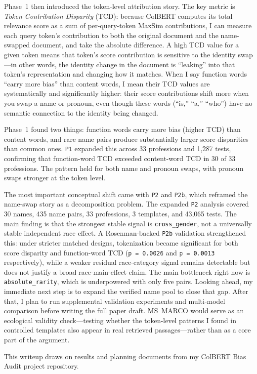 \documentclass[acmsmall,screen,review]{acmart}
\begin{document}
Phase~1 then introduced the token-level attribution story. The key metric is \emph{Token Contribution Disparity} (TCD): because ColBERT computes its total relevance score as a sum of per-query-token MaxSim contributions, I can measure each query token's contribution to both the original document and the name-swapped document, and take the absolute difference. A high TCD value for a given token means that token's score contribution is sensitive to the identity swap---in other words, the identity change in the document is ``leaking'' into that token's representation and changing how it matches. When I say function words ``carry more bias'' than content words, I mean their TCD values are systematically and significantly higher: their score contributions shift more when you swap a name or pronoun, even though these words (``is,'' ``a,'' ``who'') have no semantic connection to the identity being changed.

Phase~1 found two things: function words carry more bias (higher TCD) than content words, and rare name pairs produce substantially larger score disparities than common ones. \texttt{P1} expanded this across 33 professions and 1,287 tests, confirming that function-word TCD exceeded content-word TCD in 30 of 33 professions. The pattern held for both name and pronoun swaps, with pronoun swaps stronger at the token level.

The most important conceptual shift came with \texttt{P2} and \texttt{P2b}, which reframed the name-swap story as a decomposition problem. The expanded \texttt{P2} analysis covered 30 names, 435 name pairs, 33 professions, 3 templates, and 43,065 tests. The main finding is that the strongest stable signal is \texttt{cross\_gender}, not a universally stable independent race effect. A Rosenman-backed \texttt{P2b} validation strengthened this: under stricter matched designs, tokenization became significant for both score disparity and function-word TCD (\texttt{p = 0.0026} and \texttt{p = 0.0013} respectively), while a weaker residual race-category signal remains detectable but does not justify a broad race-main-effect claim. The main bottleneck right now is \texttt{absolute\_rarity}, which is underpowered with only five pairs. Looking ahead, my immediate next step is to expand the verified name pool to close that gap. After that, I plan to run supplemental validation experiments and multi-model comparison before writing the full paper draft. MS~MARCO would serve as an ecological validity check---testing whether the token-level patterns I found in controlled templates also appear in real retrieved passages---rather than as a core part of the argument.

\begin{acks}
This writeup draws on results and planning documents from my ColBERT Bias Audit project repository.
\end{acks}



\end{document}
